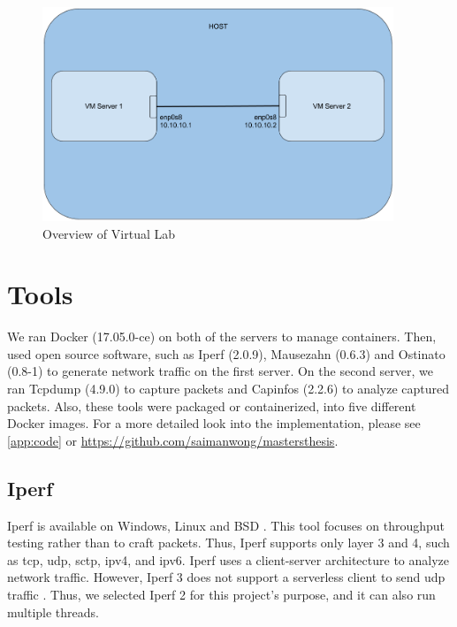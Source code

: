 \begin{figure}[h!]
    \centering
    \includegraphics[width=10.5cm]{figure/vmenv}
    \caption{Overview of Virtual Lab}
    \label{fig:vmenv}
\end{figure}

%
%
\newline
\null\newline
\section{Tools}
We ran Docker (17.05.0-ce) on both of the servers to manage containers.
Then, used open source software, such as Iperf (2.0.9), Mausezahn (0.6.3) and Ostinato (0.8-1) to generate network traffic on the first server.
On the second server, we ran Tcpdump (4.9.0) to capture packets and Capinfos (2.2.6) to analyze captured packets.
Also, these tools were packaged or containerized, into five different Docker images.
For a more detailed look into the implementation, please see \cref{app:code} or \url{https://github.com/saimanwong/mastersthesis}.

\subsection{Iperf}
Iperf is available on Windows, Linux and BSD \cite{iperf2do7:online, iPerfThe63:online}.
This tool focuses on throughput testing rather than to craft packets.
Thus, Iperf supports only layer 3 and 4, such as \acrshort{tcp}, \acrshort{udp}, \acrshort{sctp}, \acrshort{ipv4}, and \acrshort{ipv6}.
Iperf uses a client-server architecture to analyze network traffic.
However, Iperf 3 does not support a serverless client to send \acrshort{udp} traffic \cite{Serverle80:online}.
Thus, we selected Iperf 2 for this project's purpose, and it can also run multiple threads.

